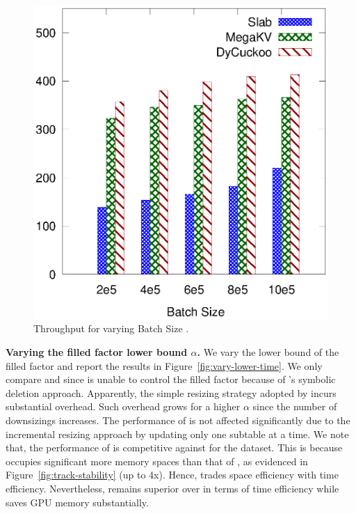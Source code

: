 \begin{figure}[htp]
\begin{minipage}{0.19\linewidth}
		\centerline{\dsali}
	\end{minipage}
	\begin{minipage}{0.19\linewidth}\centering
		\includegraphics[width=\linewidth]{pic/dynamic/batch/dynamic_random.eps}
		\centerline{\dsrandom}
	\end{minipage}
	\caption{Throughput for varying Batch Size .}
	\label{fig:vary-upper-time}
\end{figure}


\vspace{1mm}\noindent\textbf{Varying the filled factor lower bound $\alpha$.}
We vary the lower bound of the filled factor and report the results in Figure~\ref{fig:vary-lower-time}. 
We only compare \megakv and \voter since \slab is unable to control the filled factor because of \slab's symbolic deletion approach. 
Apparently, the simple resizing strategy adopted by \megakv incurs substantial overhead. Such overhead grows for a higher $\alpha$ since the number of downsizings increases. The performance of \voter is not affected significantly due to the incremental resizing approach by updating only one subtable at a time. We note that, the performance of \megakv is competitive against \voter for the \dsali dataset. This is because \megakv occupies significant more memory spaces than that of \voter, as evidenced in Figure~\ref{fig:track-stability} (up to 4x). Hence, \megakv trades space efficiency with time efficiency.
Nevertheless, \voter remains superior over \megakv in terms of time efficiency while saves GPU memory substantially. 



